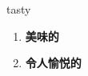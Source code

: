 
\begin{frame}
{\huge tasty}
\begin{center}
\begin{enumerate}\Large
  \item \textbf{美味的}
  \item \textbf{令人愉悦的}
\end{enumerate}
\end{center}
\end{frame}
